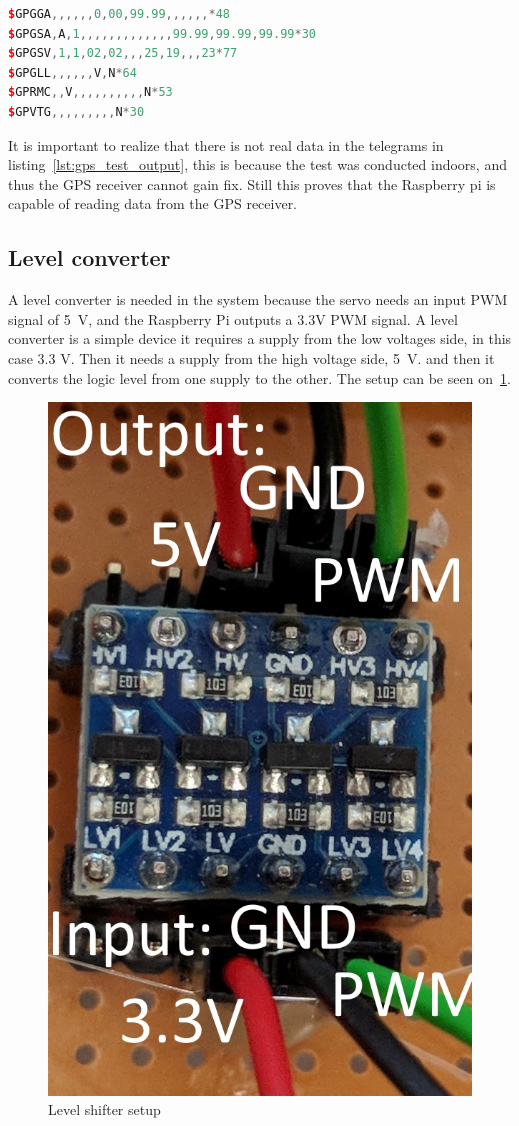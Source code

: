 \begin{lstlisting}[caption = {Output of the GPS receiver test code}, captionpos=b, label={lst:gps_test_output}, 
language=C++,firstnumber=1]
$GPGGA,,,,,,0,00,99.99,,,,,,*48
$GPGSA,A,1,,,,,,,,,,,,,99.99,99.99,99.99*30
$GPGSV,1,1,02,02,,,25,19,,,23*77
$GPGLL,,,,,,V,N*64
$GPRMC,,V,,,,,,,,,,N*53
$GPVTG,,,,,,,,,N*30
\end{lstlisting}

It is important to realize that there is not real data in the telegrams in listing~\ref{lst:gps_test_output}, this is because the test was conducted indoors, and thus the GPS receiver cannot gain fix. Still this proves that the Raspberry pi is capable of reading data from the GPS receiver.



\subsection{Level converter}
A level converter is needed in the system because the servo needs an input PWM signal of 5~V, and the Raspberry Pi outputs a 3.3V PWM signal. A level converter is a simple device it requires a supply from the low voltages side, in this case 3.3 V. Then it needs a supply from the high voltage side, 5~V. and then it converts the logic level from one supply to the other. The setup can be seen on~\ref{fig:levelshifter_setup}.

\begin{figure}[H]
\centering
\includegraphics[width=0.3\linewidth]{Images/Implementation/level_shift_setup}
\caption{Level shifter setup}
\label{fig:levelshifter_setup}
\end{figure}

